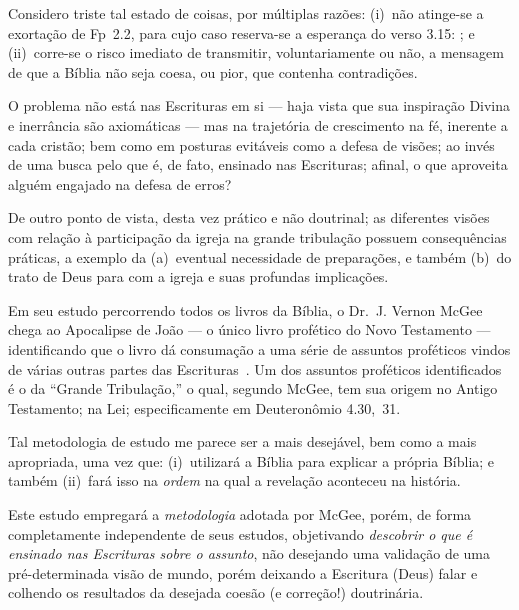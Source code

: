     Considero triste tal estado de coisas, por múltiplas razões: (i)~não  atinge-se  a  exortação  de  Fp~2.2,  para  cujo  caso
    reserva-se a esperança do verso 3.15: ; e (ii)~corre-se o  risco
    imediato de transmitir, voluntariamente ou não, a  mensagem  de  que  a  Bíblia  não  seja  coesa,  ou  pior,  que  contenha
    contradições.

    O problema não está nas Escrituras em si --- haja vista que sua inspiração Divina e inerrância são axiomáticas  ---  mas  na
    trajetória de crescimento na fé, inerente a cada cristão; bem como em posturas evitáveis como a defesa de visões;  ao  invés
    de uma busca pelo que é, de fato, ensinado nas Escrituras; afinal, o que aproveita alguém engajado na defesa de erros?

    De outro ponto de vista, desta vez prático e não doutrinal; as diferentes visões com relação à  participação  da  igreja  na
    grande tribulação possuem consequências práticas, a exemplo da (a)~eventual necessidade  de  preparações,  e  também  (b)~do
    trato de Deus para com a igreja e suas profundas implicações.

    Em seu estudo percorrendo todos os livros da Bíblia, o Dr.~J. Vernon McGee chega ao Apocalipse de João  ---  o  único  livro
    profético do Novo Testamento --- identificando que o livro dá consumação a uma série de assuntos proféticos vindos de várias
    outras partes das  Escrituras~\cite{ca1980-McGeeJV-49Rev}.  Um  dos  assuntos  proféticos  identificados  é  o  da  ``Grande
    Tribulação,'' o qual, segundo McGee, tem sua origem no Antigo Testamento; na Lei; especificamente em Deuteronômio 4.30,~31.

    Tal metodologia de estudo me parece ser a mais desejável, bem como a mais apropriada, uma vez que: (i)~utilizará a Bíblia
    para explicar a própria Bíblia; e também (ii)~fará isso na \emph{ordem} na qual a revelação aconteceu na história.

    Este estudo empregará a \emph{metodologia} adotada por McGee, porém, de forma completamente independente  de  seus  estudos,
    objetivando \emph{descobrir o que é  ensinado  nas  Escrituras  sobre  o  assunto},  não  desejando  uma  validação  de  uma
    pré-determinada visão de mundo, porém deixando a Escritura (Deus) falar e colhendo  os  resultados  da  desejada  coesão  (e
    correção!) doutrinária.


